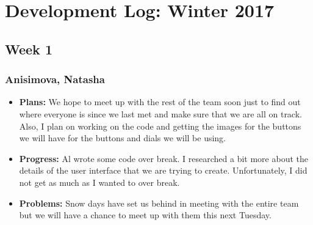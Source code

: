 \documentclass[10pt,draftclsnofoot,onecolumn]{IEEEtran}
\begin{document}
\section{Development Log: Winter 2017}
\subsection{Week 1}
\subsubsection{Anisimova, Natasha}
\begin{itemize}
	\item \textbf{Plans: }
	We hope to meet up with the rest of the team soon just to find out where everyone is since we last met and make sure that we are all on track. Also, I plan on working on the code and getting the images for the buttons we will have for the buttons and dials we will be using.
	\item \textbf{Progress: }
	Al wrote some code over break. I researched a bit more about the details of the user interface that we are trying to create. Unfortunately, I did not get as much as I wanted to over break.

	\item \textbf{Problems: }
	Snow days have set us behind in meeting with the entire team but we will have a chance to meet up with them this next Tuesday.
\end{itemize}
\end{document}
